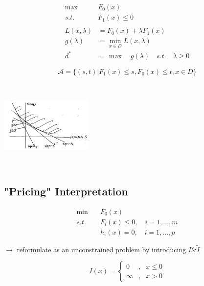 \begin{align*}
\max \quad &F_0(x)\\
s.t. \quad&F_1(x) \leq 0\\
\\
L(x,\lambda) &= F_0(x) + \lambda F_1(x)\\
g(\lambda) &= \min_{x\in D} L(x,\lambda)\\
d^* &= \max \quad g(\lambda)\quad s.t.\quad \lambda \geq 0 
\end{align*}

\begin{equation*}
\mathcal{A} =\{(s,t)\vert F_1(x)\leq s, F_0(x)\leq t, x\in D \}
\end{equation*}


\begin{marginfigure}
\centering
\includegraphics[width=1.8in,height=1.8in]{figures/ch10/figure1127_1.png}
\end{marginfigure}



\subsection{"Pricing" Interpretation}


\begin{align*}
\min \quad & F_0(x)\\
s.t.\quad & F_i(x) \leq 0,\quad i = 1,...,m\\
& h_i(x) = 0,\quad i = 1,...,p
\end{align*}

$\rightarrow$ reformulate as an unconstrained problem by introducing $I\& \tilde{I}$


\begin{equation}
\label{eq6}
I(x)=\left\{
\begin{aligned}
0 & , & x\leq 0 \\
\infty & , & x>0
\end{aligned}
\right.
\end{equation}

